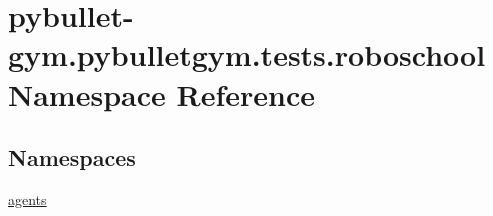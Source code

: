 \hypertarget{namespacepybullet-gym_1_1pybulletgym_1_1tests_1_1roboschool}{}\section{pybullet-\/gym.pybulletgym.\+tests.\+roboschool Namespace Reference}
\label{namespacepybullet-gym_1_1pybulletgym_1_1tests_1_1roboschool}
\subsection*{Namespaces}
\begin{DoxyCompactItemize}
\item 
 \hyperlink{namespacepybullet-gym_1_1pybulletgym_1_1tests_1_1roboschool_1_1agents}{agents}
\end{DoxyCompactItemize}
